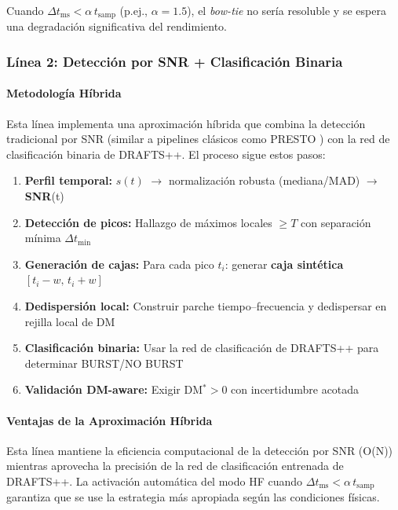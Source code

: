Cuando $\Delta t_{\mathrm{ms}} < \alpha\, t_{\mathrm{samp}}$ (p.ej., $\alpha\!=\!1.5$), el \textit{bow-tie} no sería resoluble y se espera una degradación significativa del rendimiento.

\subsubsection{Línea 2: Detección por SNR + Clasificación Binaria}

\paragraph{Metodología Híbrida}

Esta línea implementa una aproximación híbrida que combina la detección tradicional por SNR (similar a pipelines clásicos como PRESTO \cite{ransom_presto}) con la red de clasificación binaria de DRAFTS++. El proceso sigue estos pasos:

\begin{enumerate}
\item \textbf{Perfil temporal:} $s(t)$ $\rightarrow$ normalización robusta (mediana/MAD) $\rightarrow$ \textbf{SNR}(t)
\item \textbf{Detección de picos:} Hallazgo de máximos locales $\ge T$ con separación mínima $\Delta t_{\min}$
\item \textbf{Generación de cajas:} Para cada pico $t_i$: generar \textbf{caja sintética} $[t_i-w,\, t_i+w]$
\item \textbf{Dedispersión local:} Construir parche tiempo--frecuencia y dedispersar en rejilla local de DM
\item \textbf{Clasificación binaria:} Usar la red de clasificación de DRAFTS++ para determinar BURST/NO BURST
\item \textbf{Validación DM-aware:} Exigir DM$^\ast\!>\!0$ con incertidumbre acotada
\end{enumerate}

\paragraph{Ventajas de la Aproximación Híbrida}

Esta línea mantiene la eficiencia computacional de la detección por SNR (O(N)) mientras aprovecha la precisión de la red de clasificación entrenada de DRAFTS++. La activación automática del modo HF cuando $\Delta t_{\mathrm{ms}} < \alpha\, t_{\mathrm{samp}}$ garantiza que se use la estrategia más apropiada según las condiciones físicas.

